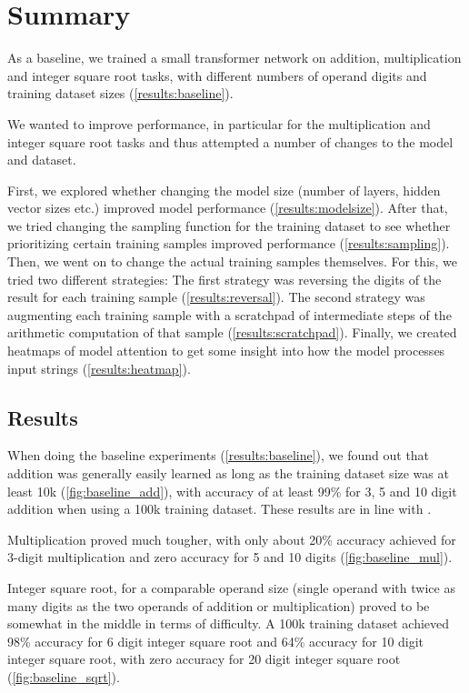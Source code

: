 \section{Summary}

As a baseline, we trained a small transformer network on addition, multiplication and integer square root tasks, with different numbers of operand digits and training dataset sizes (\cref{results:baseline}).

We wanted to improve performance, in particular for the multiplication and integer square root tasks and thus attempted a number of changes to the model and dataset.

First, we explored whether changing the model size (number of layers, hidden vector sizes etc.) improved model performance (\cref{results:modelsize}).
After that, we tried changing the sampling function for the training dataset to see whether prioritizing certain training samples improved performance (\cref{results:sampling}).
Then, we went on to change the actual training samples themselves. For this, we tried two different strategies:
The first strategy was reversing the digits of the result for each training sample (\cref{results:reversal}).
The second strategy was augmenting each training sample with a scratchpad of intermediate steps of the arithmetic computation of that sample (\cref{results:scratchpad}).
Finally, we created heatmaps of model attention to get some insight into how the model processes input strings (\cref{results:heatmap}).

\subsection{Results}
When doing the baseline experiments (\cref{results:baseline}), we found out that addition was generally easily learned as long as the training dataset size was at least 10k (\cref{fig:baseline_add}), with accuracy of at least 99\% for 3, 5 and 10 digit addition when using a 100k training dataset. These results are in line with \cite{teaching}.

Multiplication proved much tougher, with only about 20\% accuracy achieved for 3-digit multiplication and zero accuracy for 5 and 10 digits (\cref{fig:baseline_mul}).

Integer square root, for a comparable operand size (single operand with twice as many digits as the two operands of addition or multiplication) proved to be somewhat in the middle in terms of difficulty. A 100k training dataset achieved 98\% accuracy for 6 digit integer square root and 64\% accuracy for 10 digit integer square root, with zero accuracy for 20 digit integer square root (\cref{fig:baseline_sqrt}).

